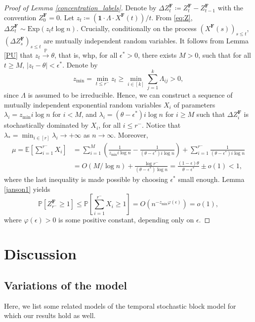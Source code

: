 \documentclass[11pt]{article}
\numberwithin{equation}{section}
\theoremstyle{definition}
\newcommand\bE{{\mathbb E}}
\newcommand\bP{{\mathbb P}}
\begin{document}
\begin{proof}[Proof of Lemma \ref{concentration_labels}]
Denote by $\Delta Z^{\boldsymbol{F}}_t \coloneqq Z^{\boldsymbol{F}}_t - Z^{\boldsymbol{F}}_{t-1}$ with the convention $Z^{\boldsymbol{F}}_0 = 0$. Let $z_t \coloneqq (\boldsymbol{1}\cdot \Lambda \cdot X^{\boldsymbol{F}}(t))/t$. From \eqref{eq:Z}, $\Delta Z^{\boldsymbol{F}}_t \sim \textrm{Exp}(z_t t\log n)$. Crucially, conditionally on the process $(X^{\boldsymbol{F}}(s))_{s\leq t}$, $(\Delta Z^{\boldsymbol{F}}_s)_{s\leq t}$ are mutually independent random variables. It follows from Lemma \ref{PU} that $z_t \overset{\bP}{\to} \theta$, that is, whp, for all $\epsilon^*>0$, there exists $M>0$, such that for all $t\geq M$, $|z_t-\theta|<\epsilon^*$. Denote by 
$$z_{\min} = \min_{t\leq r^-} z_t \geq \min_{i \in [k]}\sum_{j=1}^k \Lambda_{ij} > 0, $$
since $\Lambda$ is assumed to be irreducible. Hence, we can construct a sequence of mutually independent exponential random variables $X_i$ of parameters $\lambda_i = z_{\min}i\log n$ for $i < M$, and $\lambda_i = (\theta-\epsilon^*)i\log n$ for $i \geq M$ such that $\Delta Z^{\boldsymbol{F}}_i$ is stochastically dominated by $X_i$, for all $i \leq r^-$. Notice that $\lambda_* = \min_{i\in [r]}\lambda_i \to +\infty$ as $n\to \infty$. Moreover,
\begin{equation*}
\begin{split}
\mu = \bE\left[\sum_{i=1}^{r^-} X_i\right] &= \sum_{i=1}^M\left(\frac{1}{z_{\min}i\log n} -\frac{1}{(\theta-\epsilon^*)i\log n} \right) + \sum_{i=1}^{r^-} \frac{1}{(\theta-\epsilon^*)i\log n}\\ 
&= O(M/\log n)+\frac{\log r^-}{(\theta-\epsilon^*)\log n} = \frac{(1-\epsilon)\theta}{\theta-\epsilon^*}\pm o(1)<1,
\end{split}
\end{equation*}
where the last inequality is made possible by choosing $\epsilon^*$ small enough. Lemma \ref{janson1} yields
$$\bP[Z^{\boldsymbol{F}}_{r^-} \geq 1] \leq \bP\left[\sum_{i=1}^{r^-} X_i \geq 1\right] =O(n^{-z_{\min}\varphi(\epsilon)}) =o(1), $$
where $\varphi(\epsilon) > 0$ is some positive constant, depending only on $\epsilon$. 
\end{proof}

\section{Discussion}
\label{discussion}

\subsection{Variations of the model}
Here, we list some related models of the temporal stochastic block model for which our results hold as well.
\end{document}
